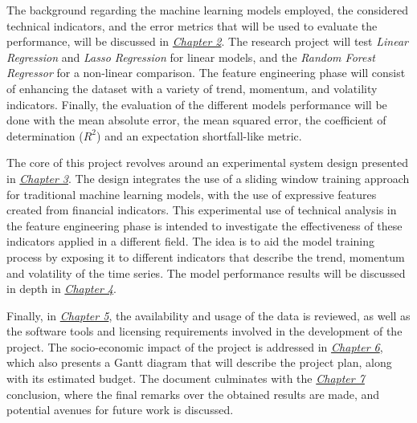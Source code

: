 \documentclass[12pt]{report} %
\begin{document}
The background regarding the machine learning models employed, the considered technical indicators, and the error metrics that will be used to evaluate the performance, will be discussed in \textit{\hyperref[chap:02]{Chapter 2}}. The research project will test \textit{Linear Regression} and \textit{Lasso Regression} for linear models, and the \textit{Random Forest Regressor} for a non-linear comparison. The feature engineering phase will consist of enhancing the dataset with a variety of trend, momentum, and volatility indicators. Finally, the evaluation of the different models performance will be done with the mean absolute error, the mean squared error, the coefficient of determination ($R^2$) and an expectation shortfall-like metric.

The core of this project revolves around an experimental system design presented in \textit{\hyperref[chap:03]{Chapter 3}}. The design integrates the use of a sliding window training approach for traditional machine learning models, with the use of expressive features created from financial indicators. This experimental use of technical analysis in the feature engineering phase is intended to investigate the effectiveness of these indicators applied in a different field. The idea is to aid the model training process by exposing it to different indicators that describe the trend, momentum and volatility of the time series. The model performance results will be discussed in depth in \textit{\hyperref[chap:04]{Chapter 4}}.

Finally, in \textit{\hyperref[chap:05]{Chapter 5}}, the availability and usage of the data is reviewed, as well as the software tools and licensing requirements involved in the development of the project. The socio-economic impact of the project is addressed in \textit{\hyperref[chap:06]{Chapter 6}}, which also presents a Gantt diagram that will describe the project plan, along with its estimated budget. The document culminates with the \textit{\hyperref[chap:07]{Chapter 7}} conclusion, where the final remarks over the obtained results are made, and potential avenues for future work is discussed.


\end{document}
